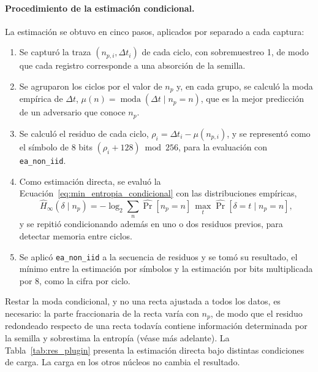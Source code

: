 \paragraph{Procedimiento de la estimación condicional.} La estimación se obtuvo en cinco pasos, aplicados por separado a cada captura:
\begin{enumerate}
    \item Se capturó la traza $(n_{p,i}, \Delta t_i)$ de cada ciclo, con sobremuestreo 1, de modo que cada registro corresponde a una absorción de la semilla.
    \item Se agruparon los ciclos por el valor de $n_p$ y, en cada grupo, se calculó la moda empírica de $\Delta t$, $\mu(n) = \operatorname{moda}(\Delta t \mid n_p = n)$, que es la mejor predicción de un adversario que conoce $n_p$.
    \item Se calculó el residuo de cada ciclo, $\rho_i = \Delta t_i - \mu(n_{p,i})$, y se representó como el símbolo de 8 bits $(\rho_i + 128) \bmod 256$, para la evaluación con \texttt{ea\_non\_iid}.
    \item Como estimación directa, se evaluó la Ecuación~\eqref{eq:min_entropia_condicional} con las distribuciones empíricas,
    \begin{equation}
        \hat{H}_\infty(\delta \mid n_p) = -\log_2 \sum_n \widehat{\Pr}[n_p = n]\, \max_t \widehat{\Pr}[\delta = t \mid n_p = n],
    \end{equation}
    y se repitió condicionando además en uno o dos residuos previos, para detectar memoria entre ciclos.
    \item Se aplicó \texttt{ea\_non\_iid} a la secuencia de residuos y se tomó su resultado, el mínimo entre la estimación por símbolos y la estimación por bits multiplicada por 8, como la cifra por ciclo.
\end{enumerate}
Restar la moda condicional, y no una recta ajustada a todos los datos, es necesario: la parte fraccionaria de la recta varía con $n_p$, de modo que el residuo redondeado respecto de una recta todavía contiene información determinada por la semilla y sobrestima la entropía (véase más adelante). La Tabla~\ref{tab:res_plugin} presenta la estimación directa bajo distintas condiciones de carga. La carga en los otros núcleos no cambia el resultado.

